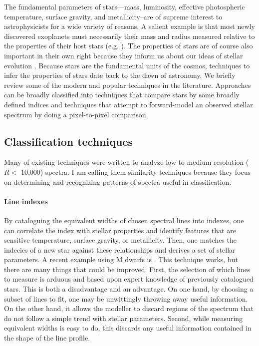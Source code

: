 \documentclass[preprint]{aastex} %
\begin{document}
The fundamental parameters of stars---mass, luminosity, effective photospheric temperature, surface gravity, and metallicity--are of supreme interest to astrophysicists for a wide variety of reasons. A salient example is that most newly discovered exoplanets must necessarily their mass and radius measured relative to the properties of their host stars (e.g. \citealt{tfs+12,blj+12,ssm+13}). The properties of stars are of course also important in their own right because they inform us about our ideas of stellar evolution \citep{dm97, bca+02}. Because stars are the fundamental units of the cosmos, techniques to infer the properties of stars date back to the dawn of astronomy. We briefly review some of the modern and popular techniques in the literature. Approaches can be broadly classified into techniques that compare stars by some broadly defined indices and techniques that attempt to forward-model an observed stellar spectrum by doing a pixel-to-pixel comparison.

\subsection{Classification techniques}
Many of existing techniques were written to analyze low to medium resolution ($R < $ 10,000) spectra. I am calling them similarity techniques because they focus on determining and recognizing patterns of spectra useful in classification.

\paragraph{Line indexes} By cataloguing the equivalent widths of chosen spectral lines into indexes, one can correlate the index with stellar properties and identify features that are sensitive temperature, surface gravity, or metallicity. Then, one matches the indecies of a new star against these relationships and derives a set of stellar parameters. A recent example using M dwarfs is \citet{nci+14}. This technique works, but there are many things that could be improved. First, the selection of which lines to measure is arduous and based upon expert knowledge of previously catalogued stars. This is both a disadvantage and an advantage. On one hand, by choosing a subset of lines to fit, one may be unwittingly throwing away useful information. On the other hand, it allows the modeller to discard regions of the spectrum that do not follow a simple trend with stellar parameters. Second, while measuring equivalent widths is easy to do, this discards any useful information contained in the shape of the line profile. 
\end{document}
